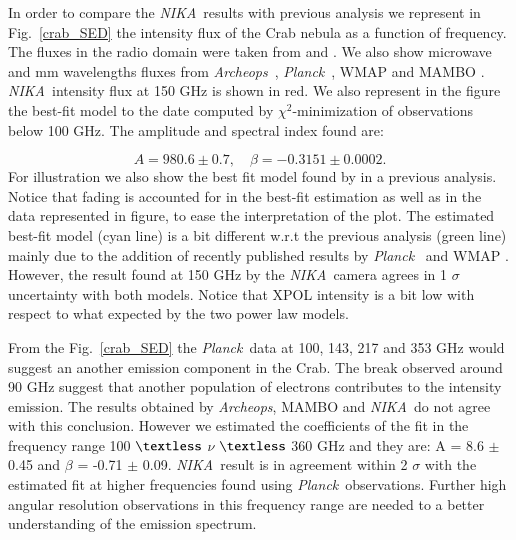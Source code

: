 \documentclass[twocolumn,traditabstract]{aa}
\def\NIKA{\textit{NIKA}}
\def\Archeops{\textit{Archeops}}
\def\Planck{\textit{Planck}}
\begin{document}
In order to compare the \NIKA\ results with previous analysis we represent in Fig.~\ref{crab_SED} the intensity flux of the Crab nebula as a function of frequency. The fluxes in the radio domain were taken from \cite{dmitrenko1970absolute} and \cite{1971IzVUZ..14..157V}. We also show microwave and mm wavelengths fluxes from \Archeops\ \citep{macias2007archeops}, \Planck\ \citep{2015arXiv150702058P}, WMAP \citep{2011ApJS..192...19W} and MAMBO \citep{2002A&A...386.1044B}. \NIKA\ intensity flux at 150 GHz is shown in red.
We also represent in the figure the best-fit model to the date computed by $\chi^2$-minimization of observations below 100 GHz. The amplitude and spectral index found are: 

\begin{equation}
 A = 980.6 \pm 0.7  ,\quad \beta = -0.3151 \pm 0.0002. 
 \end{equation}
 For illustration we also show the best fit model found by \cite{macias2010} in a previous analysis. 
Notice that fading is accounted for in the best-fit estimation as well as in the data represented in figure, to ease the interpretation of the plot.
The estimated best-fit model (cyan line) is a bit different w.r.t the previous analysis (green line) mainly due to the addition of recently published results by \Planck\ \citep{2015arXiv150702058P} and  WMAP \citep{2011ApJS..192...19W}. However, the result found at 150 GHz by the \NIKA\ camera agrees in 1 $\sigma$ uncertainty with both models. 
Notice that XPOL intensity is a bit low with respect to what expected by the two power law models. 
 
From the Fig.~\ref{crab_SED} the \Planck\ data at 100, 143, 217 and 353 GHz would suggest an another emission component in the Crab. The break observed around 90 GHz   suggest that another population of electrons contributes to the intensity emission. The results obtained by {\it Archeops}, MAMBO and \NIKA\ do not agree with this conclusion. 
However we estimated the coefficients of the fit in the frequency range 100 $\textless$ $\nu$ $\textless$ 360 GHz and they are: A = 8.6 $\pm$ 0.45 and $\beta$ = -0.71 $\pm$ 0.09. 
\NIKA\ result is in agreement within 2 $\sigma$ with the estimated fit at higher frequencies found using \Planck\ observations.
 Further high angular resolution observations in this frequency range are needed to a better understanding of the emission spectrum. 
\end{document}
